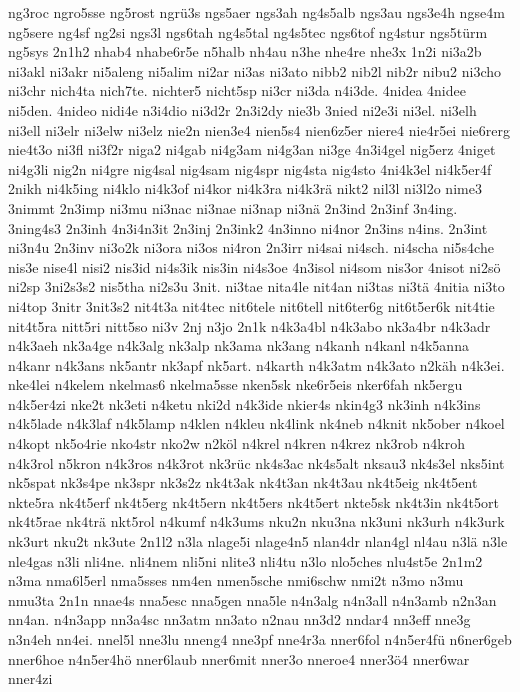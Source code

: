 {ng3roc
ngro5sse
ng5rost
ngrü3s
ngs5aer
ngs3ah
ng4s5alb
ngs3au
ngs3e4h
ngse4m
ng5sere
ng4sf
ng2si
ngs3l
ngs6tah
ng4s5tal
ng4s5tec
ngs6tof
ng4stur
ngs5türm
ng5sys
2n1h2
nhab4
nhabe6r5e
n5halb
nh4au
n3he
nhe4re
nhe3x
1n2i
ni3a2b
ni3akl
ni3akr
ni5aleng
ni5alim
ni2ar
ni3as
ni3ato
nibb2
nib2l
nib2r
nibu2
ni3cho
ni3chr
nich4ta
nich7te.
nichter5
nicht5sp
ni3cr
ni3da
n4i3de.
4nidea
4nidee
ni5den.
4nideo
nidi4e
n3i4dio
ni3d2r
2n3i2dy
nie3b
3nied
ni2e3i
ni3el.
ni3elh
ni3ell
ni3elr
ni3elw
ni3elz
nie2n
nien3e4
nien5s4
nien6z5er
niere4
nie4r5ei
nie6rerg
nie4t3o
ni3fl
ni3f2r
niga2
ni4gab
ni4g3am
ni4g3an
ni3ge
4n3i4gel
nig5erz
4niget
ni4g3li
nig2n
ni4gre
nig4sal
nig4sam
nig4spr
nig4sta
nig4sto
4ni4k3el
ni4k5er4f
2nikh
ni4k5ing
ni4klo
ni4k3of
ni4kor
ni4k3ra
ni4k3rä
nikt2
nil3l
ni3l2o
nime3
3nimmt
2n3imp
ni3mu
ni3nac
ni3nae
ni3nap
ni3nä
2n3ind
2n3inf
3n4ing.
3ning4s3
2n3inh
4n3i4n3it
2n3inj
2n3ink2
4n3inno
ni4nor
2n3ins
n4ins.
2n3int
ni3n4u
2n3inv
ni3o2k
ni3ora
ni3os
ni4ron
2n3irr
ni4sai
ni4sch.
ni4scha
ni5s4che
nis3e
nise4l
nisi2
nis3id
ni4s3ik
nis3in
ni4s3oe
4n3isol
ni4som
nis3or
4nisot
ni2sö
ni2sp
3ni2s3s2
nis5tha
ni2s3u
3nit.
ni3tae
nita4le
nit4an
ni3tas
ni3tä
4nitia
ni3to
ni4top
3nitr
3nit3s2
nit4t3a
nit4tec
nit6tele
nit6tell
nit6ter6g
nit6t5er6k
nit4tie
nit4t5ra
nitt5ri
nitt5so
ni3v
2nj
n3jo
2n1k
n4k3a4bl
n4k3abo
nk3a4br
n4k3adr
n4k3aeh
nk3a4ge
n4k3alg
nk3alp
nk3ama
nk3ang
n4kanh
n4kanl
n4k5anna
n4kanr
n4k3ans
nk5antr
nk3apf
nk5art.
n4karth
n4k3atm
n4k3ato
n2käh
n4k3ei.
nke4lei
n4kelem
nkelmas6
nkelma5sse
nken5sk
nke6r5eis
nker6fah
nk5ergu
n4k5er4zi
nke2t
nk3eti
n4ketu
nki2d
n4k3ide
nkier4s
nkin4g3
nk3inh
n4k3ins
n4k5lade
n4k3laf
n4k5lamp
n4klen
n4kleu
nk4link
nk4neb
n4knit
nk5ober
n4koel
n4kopt
nk5o4rie
nko4str
nko2w
n2köl
n4krel
n4kren
n4krez
nk3rob
n4kroh
n4k3rol
n5kron
n4k3ros
n4k3rot
nk3rüc
nk4s3ac
nk4s5alt
nksau3
nk4s3el
nks5int
nk5spat
nk3s4pe
nk3spr
nk3s2z
nk4t3ak
nk4t3an
nk4t3au
nk4t5eig
nk4t5ent
nkte5ra
nk4t5erf
nk4t5erg
nk4t5ern
nk4t5ers
nk4t5ert
nkte5sk
nk4t3in
nk4t5ort
nk4t5rae
nk4trä
nkt5rol
n4kumf
n4k3ums
nku2n
nku3na
nk3uni
nk3urh
n4k3urk
nk3urt
nku2t
nk3ute
2n1l2
n3la
nlage5i
nlage4n5
nlan4dr
nlan4gl
nl4au
n3lä
n3le
nle4gas
n3li
nli4ne.
nli4nem
nli5ni
nlite3
nli4tu
n3lo
nlo5ches
nlu4st5e
2n1m2
n3ma
nma6l5erl
nma5sses
nm4en
nmen5sche
nmi6schw
nmi2t
n3mo
n3mu
nmu3ta
2n1n
nnae4s
nna5esc
nna5gen
nna5le
n4n3alg
n4n3all
n4n3amb
n2n3an
nn4an.
n4n3app
nn3a4sc
nn3atm
nn3ato
n2nau
nn3d2
nndar4
nn3eff
nne3g
n3n4eh
nn4ei.
nnel5l
nne3lu
nneng4
nne3pf
nne4r3a
nner6fol
n4n5er4fü
n6ner6geb
nner6hoe
n4n5er4hö
nner6laub
nner6mit
nner3o
nneroe4
nner3ö4
nner6war
nner4zi
}

